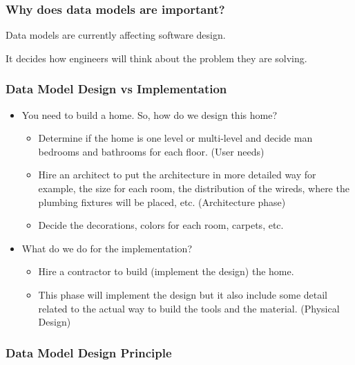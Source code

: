 
\begin{frame}
\frametitle{Why does data models are important?}
\begin{wideitemize}	
\item Data models are currently affecting software design. 
\item It decides how engineers will think about the problem they are solving.
\end{wideitemize}
\end{frame}

\begin{frame}
\frametitle{Data Model Design vs Implementation}
\begin{itemize}[<+->]
\item You need to build a home. So, how do we design this home?
\begin{itemize}[<+->]
\item Determine if the home is one level or multi-level and decide man bedrooms and bathrooms for each floor. (User needs)
\item Hire an architect to put the architecture in more detailed way for example, the size for each room, the distribution of the wireds, where the plumbing fixtures will be placed, etc. (Architecture phase)
\item Decide the decorations, colors for each room, carpets, etc. 
\end{itemize}
\item What do we do for the implementation?
\begin{itemize}[<+->]
\item Hire a contractor to build (implement the design) the home. 
\item This phase will implement the design but it also include some detail related to the actual way to build the tools and the material. (Physical Design)
\end{itemize}		
\end{itemize}
\end{frame}


\begin{frame}
\frametitle{Data Model Design Principle }

\end{frame}

